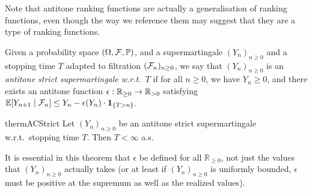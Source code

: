 Note that antitone ranking functions are actually a generalisation of ranking functions, even though the way we reference them may suggest that they are a type of ranking functions.

\iffalse
\lo{An aside: This CBV $\tY$-rule seems cleaner:
\[
\big(\tY f^{A \to B} \, x^A \, . \, \theta^B \big) \, v \to \theta[(\tY f \, x \, . \, \theta) / f, v / x].
\]
We assume $\tY f^{A \to B} \, x^A \, . \, \theta^B$ is a value.}
\fi

\begin{definition}
Given a probability space $(\Omega, \mathcal{F}, \mathbb{P})$, and a supermartingale $(Y_n)_{n \geq 0}$ and a stopping time $T$ adapted to filtration $(\mathcal{F}_n)_{n \geq 0}$,
we say that $(Y_n)_{n \geq 0}$ is an \emph{antitone strict supermartingale w.r.t.~$T$} if for all $n \geq 0$, we have $Y_n \geq 0$, and there exists an antitone function $\epsilon : \mathbb{R}_{{\geq}0} \to \mathbb{R}_{{>}0}$ satisfying
\(
\mathbb{E}[Y_{n+1} \mid \mathcal{F}_n] \leq Y_n - \epsilon (Y_n) \cdot {\bf 1}_{\{T > n\}}
\).
\end{definition}


\begin{restatable}{therm}{ACStrict}
\label{thm:a-c strict}
Let $(Y_n)_{n \geq 0}$ be an antitone strict supermartingale w.r.t.~stopping time $T$. 
Then $T < \infty$ a.s.
\end{restatable}

It is essential in this theorem that $\epsilon$ be defined for all $\mathbb R_{\geq 0}$, not just the values that $(Y_n)_{n \geq 0}$ actually takes (or at least if $(Y_n)_{n \geq 0}$ is uniformly bounded, $\epsilon$ must be positive at the supremum as well as the realized values). 

